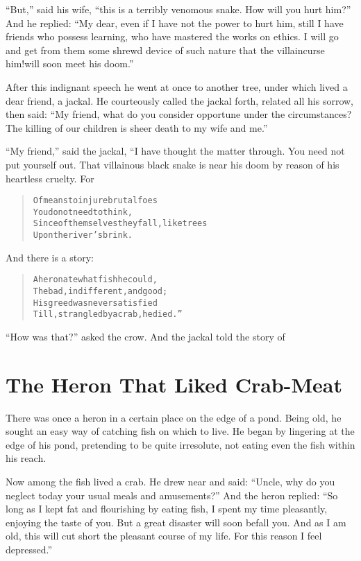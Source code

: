 \documentclass[article, twoside, 14pt]{memoir}
\renewenvironment{verbatim}{%
\begin{quote}%
\vskip -10pt%
\begin{alltt}\normalfont\large}{\end{alltt}%
\end{quote}%
\vskip -10pt
} %
\begin{document}
``But,'' said his wife,
``this is a terribly venomous snake. How will you hurt him?''
And he replied:
``My dear, even if I have not the power to hurt him, still I have friends who possess learning, who have mastered the works on ethics. I will go and get from them some shrewd device of such nature that the villain{\textemdash}curse him!{\textemdash}will soon meet his doom.''

After this indignant speech he went at once to another tree, under
which lived a dear friend, a jackal. He courteously called the
jackal forth, related all his sorrow, then said:
``My friend, what do you consider opportune under the circumstances? The killing of our children is sheer death to my wife and me.''

``My friend,'' said the jackal, “I have thought the matter through.
You need not put yourself out. That villainous black snake is near
his doom by reason of his heartless cruelty. For

\begin{verbatim}
Of means to injure brutal foes
    You do not need to think,
Since of themselves they fall, like trees
    Upon the river's brink.
\end{verbatim}
And there is a story:

\begin{verbatim}
A heron ate what fish he could,
The bad, indifferent, and good;
His greed was never satisfied
Till, strangled by a crab, he died.”
\end{verbatim}
``How was that?'' asked the crow. And the jackal told the story of

\chapter{The Heron That Liked Crab-Meat}

\label{s9}

There was once a heron in a certain place on the edge of a pond.
Being old, he sought an easy way of catching fish on which to live.
He began by lingering at the edge of his pond, pretending to be
quite irresolute, not eating even the fish within his reach.

Now among the fish lived a crab. He drew near and said:
``Uncle, why do you neglect today your usual meals and amusements?''
And the heron replied:
``So long as I kept fat and flourishing by eating fish, I spent my time pleasantly, enjoying the taste of you. But a great disaster will soon befall you. And as I am old, this will cut short the pleasant course of my life. For this reason I feel depressed.''
\end{document}
